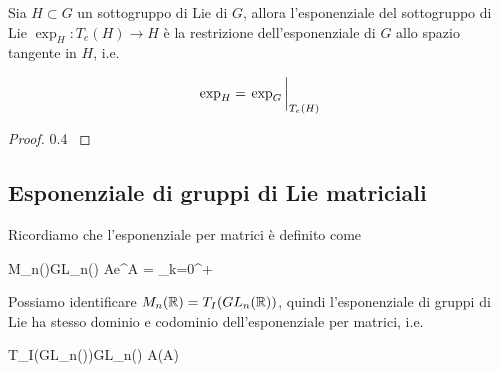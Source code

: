 \begin{corollary}\label{cor:subgr-lie-exp-tang}
	Sia $ H \subset G $ un sottogruppo di Lie di $ G $, allora l'esponenziale del sottogruppo di Lie $ \exp_{H} : T_{e}(H) \to H $ è la restrizione dell'esponenziale di $ G $ allo spazio tangente in $ H $, i.e.
	
	\begin{equation}
		\exp_{H} = \eval{\exp_{G}}_{T_{e}(H)}
	\end{equation}
\end{corollary}

\begin{proof}\hfill\break

		{0.4}{%
				}
\end{proof}

\subsection{Esponenziale di gruppi di Lie matriciali}

Ricordiamo che l'esponenziale per matrici è definito come

	{M_{n}(\R)}{GL_{n}(\R)}
	{A}{e^{A} = \sum_{k=0}^{+\infty} }

Possiamo identificare $ M_{n}(\mathbb{R}) = T_{I}(GL_{n}(\mathbb{R})) $, quindi l'esponenziale di gruppi di Lie ha stesso dominio e codominio dell'esponenziale per matrici, i.e.

\map{\exp}
	{T_{I}(GL_{n}(\R))}{GL_{n}(\R)}
	{A}{\exp(A)}

